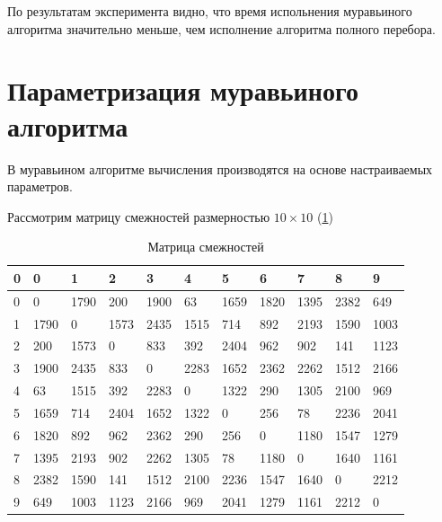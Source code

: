 \documentclass[12pt,a4paper]{report}
\begin{document}
По результатам эксперимента видно, что время испольнения муравьиного алгоритма
значительно меньше, чем исполнение алгоритма полного перебора.

\section{Параметризация муравьиного алгоритма}

В муравьином алгоритме вычисления производятся на основе настраиваемых параметров.

Рассмотрим матрицу смежностей размерностью $10\times10$ (\ref{table:matrix})

\begin{table}[ht]
	\centering
	\caption{Матрица смежностей}
	\label{table:matrix}
	\begin{tabular}{ | l | l | l | l | l | l | l | l | l | l | l |}
		\hline
		0 & 0    & 1    & 2    & 3    & 4    & 5    & 6    & 7    & 8    & 9    \\ \hline
		0 & 0    & 1790 & 200  & 1900 & 63   & 1659 & 1820 & 1395 & 2382 & 649  \\ \hline
		1 & 1790 & 0    & 1573 & 2435 & 1515 & 714  & 892  & 2193 & 1590 & 1003 \\ \hline
		2 & 200  & 1573 & 0    & 833  & 392  & 2404 & 962  & 902  & 141  & 1123 \\ \hline
		3 & 1900 & 2435 & 833  & 0    & 2283 & 1652 & 2362 & 2262 & 1512 & 2166 \\ \hline
		4 & 63   & 1515 & 392  & 2283 & 0    & 1322 & 290  & 1305 & 2100 & 969  \\ \hline
		5 & 1659 & 714  & 2404 & 1652 & 1322 & 0    & 256  & 78   & 2236 & 2041 \\ \hline
		6 & 1820 & 892  & 962  & 2362 & 290  & 256  & 0    & 1180 & 1547 & 1279 \\ \hline
		7 & 1395 & 2193 & 902  & 2262 & 1305 & 78   & 1180 & 0    & 1640 & 1161 \\ \hline
		8 & 2382 & 1590 & 141  & 1512 & 2100 & 2236 & 1547 & 1640 & 0    & 2212 \\ \hline
		9 & 649  & 1003 & 1123 & 2166 & 969  & 2041 & 1279 & 1161 & 2212 & 0    \\ \hline
	\end{tabular}
\end{table}

\end{document}
